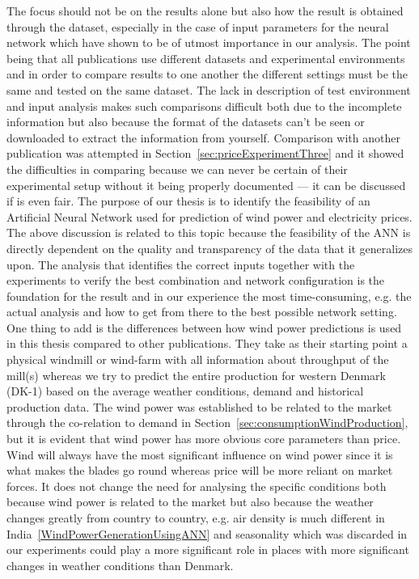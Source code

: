 The focus should not be on the results alone but also how the result is obtained through the dataset, especially in the case of input parameters for the neural network which have shown to be of utmost importance in our analysis. The point being that all publications use different datasets and experimental environments and in order to compare results to one another the different settings must be the same and tested on the same dataset. The lack in description of test environment and input analysis makes such comparisons difficult both due to the incomplete information but also because the format of the datasets can't be seen or downloaded to extract the information from yourself. Comparison with another publication was attempted in Section~\ref{sec:priceExperimentThree} and it showed the difficulties in comparing because we can never be certain of their experimental setup without it being properly documented --- it can be discussed if is even fair. The purpose of our thesis is to identify the feasibility of an Artificial Neural Network used for prediction of wind power and electricity prices. The above discussion is related to this topic because the feasibility of the ANN is directly dependent on the quality and transparency of the data that it generalizes upon. The analysis that identifies the correct inputs together with the experiments to verify the best combination and network configuration is the foundation for the result and in our experience the most time-consuming, e.g. the actual analysis and how to get from there to the best possible network setting. One thing to add is the differences between how wind power predictions is used in this thesis compared to other publications. They take as their starting point a physical windmill or wind-farm with all information about throughput of the mill(s)\cite{windForecastPortugal,ShortTermWindPowerForecasting,dayAheadImpactOfWindPowerForecasts,WindPowerGenerationUsingANN} whereas we try to predict the entire production for western Denmark (DK-1) based on the average weather conditions, demand and historical production data. The wind power was established to be related to the market through the co-relation to demand in Section~\ref{sec:consumptionWindProduction}, but it is evident that wind power has more obvious core parameters than price. Wind will always have the most significant influence on wind power since it is what makes the blades go round whereas price will be more reliant on market forces. It does not change the need for analysing the specific conditions both because wind power is related to the market but also because the weather changes greatly from country to country, e.g. air density is much different in India~\ref{WindPowerGenerationUsingANN} and seasonality which was discarded in our experiments could play a more significant role in places with more significant changes in weather conditions than Denmark.

